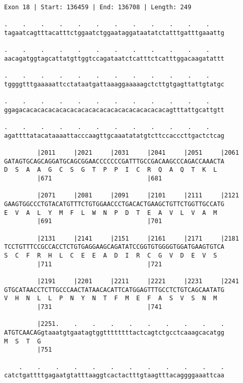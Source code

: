 \documentclass{article}
\begin{document}
\newpage
\begin{Verbatim}[fontfamily=courier]
Exon 18 | Start: 136459 | End: 136708 | Length: 249

.    .    .    .    .    .    .    .    .    .    .    .    
tagaatcagtttacatttctggaatctggaataggataatatctatttgatttgaaattg

.    .    .    .    .    .    .    .    .    .    .    .    
aacagatggtagcattatgttggtccagataatctcatttctcatttggacaagatattt

.    .    .    .    .    .    .    .    .    .    .    .    
tggggtttgaaaaattcctataatgattaaaggaaaaagctcttgtgagttattgtatgc

.    .    .    .    .    .    .    .    .    .    .    .    
ggagacacacacacacacacacacacacacacacacacacacacagtttattgcattgtt

.    .    .    .    .    .    .    .    .    .    .    .    
agattttatacataaaattacccaagttgcaaatatatgtcttccacccttgactctcag

         |2011     |2021     |2031     |2041     |2051     |2061
GATAGTGCAGCAGGATGCAGCGGAACCCCCCCGATTTGCCGACAAGCCCAGACCAAACTA
D  S  A  A  G  C  S  G  T  P  P  I  C  R  Q  A  Q  T  K  L  
         |671                          |681                 

         |2071     |2081     |2091     |2101     |2111     |2121
GAAGTGGCCCTGTACATGTTTCTGTGGAACCCTGACACTGAAGCTGTTCTGGTTGCCATG
E  V  A  L  Y  M  F  L  W  N  P  D  T  E  A  V  L  V  A  M  
         |691                          |701                 

         |2131     |2141     |2151     |2161     |2171     |2181
TCCTGTTTCCGCCACCTCTGTGAGGAAGCAGATATCCGGTGTGGGGTGGATGAAGTGTCA
S  C  F  R  H  L  C  E  E  A  D  I  R  C  G  V  D  E  V  S  
         |711                          |721                 

         |2191     |2201     |2211     |2221     |2231     |2241
GTGCATAACCTCTTGCCCAACTATAACACATTCATGGAGTTTGCCTCTGTCAGCAATATG
V  H  N  L  L  P  N  Y  N  T  F  M  E  F  A  S  V  S  N  M  
         |731                          |741                 

         |2251.    .    .    .    .    .    .    .    .    .
ATGTCAACAGgtaaatgtgaatagtggttttttttactcagtctgcctcaaagcacatgg
M  S  T  G                                                  
         |751                                               

    .    .    .    .    .    .    .    .    .    .    .    .
catctgattttgagaatgtatttaaggtcactactttgtaagtttacaggggaaattcaa

\end{Verbatim}
\end{document}
